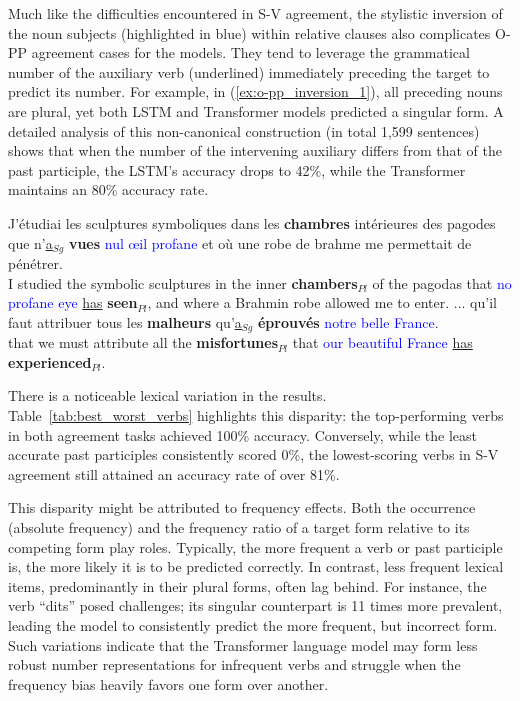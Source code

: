 Much like the difficulties encountered in S-V agreement, the stylistic inversion of the noun subjects (highlighted in blue) within relative clauses also complicates O-PP agreement cases for the models. They tend to leverage the grammatical number of the auxiliary verb (underlined) immediately preceding the target to predict its number. For example, in (\ref{ex:o-pp_inversion_1}), all preceding nouns are plural, yet both LSTM and Transformer models predicted a singular form. A detailed analysis of this non-canonical construction (in total 1,599 sentences) shows that when the number of the intervening auxiliary differs from that of the past participle, the LSTM's accuracy drops to 42\%, while the Transformer maintains an 80\% accuracy rate.
 
\begin{exe}
    \ex \label{ex:o-pp_inversion_1} J'étudiai les sculptures symboliques dans les \textbf{chambres} intérieures des pagodes que n'\underline{a}$_{Sg}$ \textbf{vues} \textcolor{blue}{nul œil profane} et où une robe de brahme me permettait de pénétrer. \\
    {\fontsize{11}{11}\selectfont I studied the symbolic sculptures in the inner \textbf{chambers}$_{Pl}$ of the pagodas that \textcolor{blue}{no profane eye} \underline{has} \textbf{seen}$_{Pl}$, and where a Brahmin robe allowed me to enter. }
    \ex \label{ex:o-pp_inversion_2} ... qu'il faut attribuer tous les \textbf{malheurs} qu'\underline{a}$_{Sg}$ \textbf{éprouvés} \textcolor{blue}{notre belle France}. \\
    {\fontsize{11}{11}\selectfont that we must attribute all the \textbf{misfortunes}$_{Pl}$ that \textcolor{blue}{our beautiful France} \underline{has} \textbf{experienced}$_{Pl}$.}
\end{exe}


 \label{app:lexical_freq_analysis}
There is a noticeable lexical variation in the results. Table~\ref{tab:best_worst_verbs} highlights this disparity: the top-performing verbs in both agreement tasks achieved 100\% accuracy. Conversely, while the least accurate past participles consistently scored 0\%, the lowest-scoring verbs in S-V agreement still attained an accuracy rate of over 81\%.

This disparity might be attributed to frequency effects. Both the occurrence (absolute frequency) and the frequency ratio of a target form relative to its competing form play roles. Typically, the more frequent a verb or past participle is, the more likely it is to be predicted correctly. In contrast, less frequent lexical items, predominantly in their plural forms, often lag behind. For instance, the verb ``dits'' posed challenges; its singular counterpart is 11 times more prevalent, leading the model to consistently predict the more frequent, but incorrect form. Such variations indicate that the Transformer language model may form less robust number representations for infrequent verbs and struggle when the frequency bias heavily favors one form over another.


